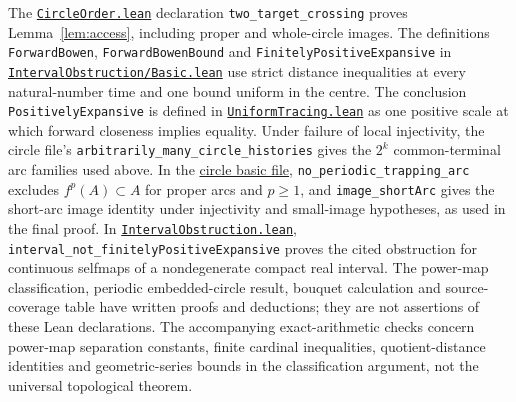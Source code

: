 \documentclass[11pt]{article}
\begin{document}
The \href{https://github.com/the-omega-institute/trureturing/blob/71b4d849a96f7050cd0e6270e1551e061c680e33/D5/S1/Dynamics/Shadowing/CircleFinitePositiveExpansiveness/CircleOrder.lean}{\texttt{CircleOrder.lean}} declaration \texttt{two\_target\_crossing}
proves Lemma~\ref{lem:access}, including proper and whole-circle images.
The definitions \texttt{ForwardBowen}, \texttt{ForwardBowenBound} and \texttt{FinitelyPositive\allowbreak Expansive} in
\href{https://github.com/the-omega-institute/trureturing/blob/71b4d849a96f7050cd0e6270e1551e061c680e33/D5/S1/Dynamics/Shadowing/IntervalObstruction/Basic.lean}{\texttt{IntervalObstruction/Basic.lean}}
use strict distance inequalities at every natural-number time and one bound uniform in the centre.
The conclusion \texttt{PositivelyExpansive} is defined in
\href{https://github.com/the-omega-institute/trureturing/blob/71b4d849a96f7050cd0e6270e1551e061c680e33/D5/S1/Dynamics/Shadowing/UniformTracing.lean}{\texttt{UniformTracing.lean}}
as one positive scale at which forward closeness implies equality.
Under failure of local injectivity, the circle file's
\texttt{arbitrarily\_\allowbreak many\_\allowbreak circle\_\allowbreak histories}
gives the $2^k$ common-terminal arc families used above.
In the \href{https://github.com/the-omega-institute/trureturing/blob/71b4d849a96f7050cd0e6270e1551e061c680e33/D5/S1/Dynamics/Shadowing/CircleFinitePositiveExpansiveness/Basic.lean}{circle basic file},
\texttt{no\_periodic\_trapping\_arc} excludes $f^p(A)\subset A$ for proper
arcs and $p\ge1$, and \texttt{image\_shortArc} gives the short-arc image
identity under injectivity and small-image hypotheses, as used in the
final proof.
In \href{https://github.com/the-omega-institute/trureturing/blob/71b4d849a96f7050cd0e6270e1551e061c680e33/D5/S1/Dynamics/Shadowing/IntervalObstruction.lean}{\texttt{IntervalObstruction.lean}},
\texttt{interval\_not\_finitelyPositiveExpansive} proves the cited
obstruction for continuous selfmaps of a nondegenerate compact real interval.
The power-map classification, periodic embedded-circle result, bouquet
calculation and source-coverage table have written proofs and deductions;
they are not assertions of these Lean declarations. The accompanying
exact-arithmetic checks concern power-map separation constants, finite
cardinal inequalities, quotient-distance identities and geometric-series
bounds in the classification argument, not the universal topological theorem.
\endgroup
\end{document}
